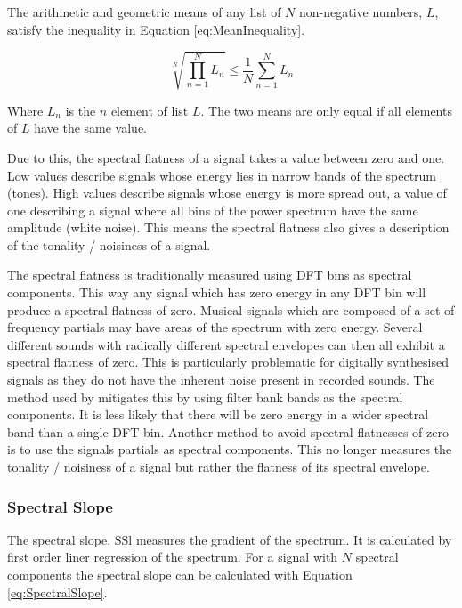 			The arithmetic and geometric means of any list of $N$ non-negative numbers, $L$, satisfy the
			inequality in Equation \ref{eq:MeanInequality}.

			\begin{equation}
				\sqrt[N]{\prod_{n = 1}^{N} L_{n}} \leq \frac{1}{N} \sum_{n = 1}^{N} L_{n}
				\label{eq:MeanInequality}
			\end{equation}

			Where $L_{n}$ is the $n$ element of list $L$. The two means are only equal if all
			elements of $L$ have the same value.

			Due to this, the spectral flatness of a signal takes a value between zero and one. Low values
			describe signals whose energy lies in narrow bands of the spectrum (tones). High values describe
			signals whose energy is more spread out, a value of one describing a signal where all bins of the
			power spectrum have the same amplitude (white noise). This means the spectral flatness also gives a
			description of the tonality / noisiness of a signal.

			The spectral flatness is traditionally measured using DFT bins as spectral components. This way any
			signal which has zero energy in any DFT bin will produce a spectral flatness of zero. Musical
			signals which are composed of a set of frequency partials may have areas of the spectrum with zero
			energy. Several different sounds with radically different spectral envelopes can then all exhibit a
			spectral flatness of zero. This is particularly problematic for digitally synthesised signals as
			they do not have the inherent noise present in recorded sounds. The method used by
			\citet{peeters2004a} mitigates this by using filter bank bands as the spectral components. It is
			less likely that there will be zero energy in a wider spectral band than a single DFT bin. Another
			method to avoid spectral flatnesses of zero is to use the signals partials as spectral components.
			This no longer measures the tonality / noisiness of a signal but rather the flatness of its
			spectral envelope.

		\subsubsection*{Spectral Slope}
			The spectral slope, $\mathrm{SSl}$ measures the gradient of the spectrum. It is calculated by first
			order liner regression of the spectrum. For a signal with $N$ spectral components the spectral
			slope can be calculated with Equation \ref{eq:SpectralSlope}.

